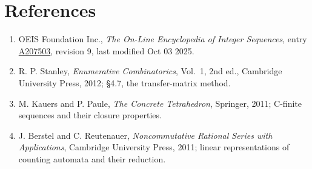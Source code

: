 \documentclass[11pt]{article}
\theoremstyle{definition}
\begin{document}
\section{References}

\begin{enumerate}

\item OEIS Foundation Inc., \emph{The On-Line Encyclopedia of Integer Sequences}, entry \href{https://oeis.org/A207503}{A207503}, revision 9, last modified Oct 03 2025.

\item R. P. Stanley, \emph{Enumerative Combinatorics}, Vol.~1, 2nd ed., Cambridge University Press, 2012; \S4.7, the transfer-matrix method.

\item M. Kauers and P. Paule, \emph{The Concrete Tetrahedron}, Springer, 2011; C-finite sequences and their closure properties.

\item J. Berstel and C. Reutenauer, \emph{Noncommutative Rational Series with Applications}, Cambridge University Press, 2011; linear representations of counting automata and their reduction.

\end{enumerate}
\end{document}
